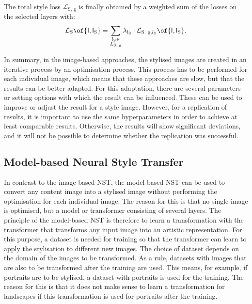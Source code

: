 The total style loss $\mathcal{L}_\text{S, g}$ is finally obtained by a weighted sum of the losses on the selected layers with:
\begin{equation*}
	\mathcal{L}_\text{S}\of{\tensor{I}\eqcommasep \tensor{I}_\text{S}} = \sum_{\substack{l_\text{S} \in\\L_\text{S, g}}} \lambda_{l_\text{S}} \cdot \mathcal{L}_{\text{S, g}\eqcommasep l_\text{S}}\of{\tensor{I}\eqcommasep \tensor{I}_\text{S}} \eqtextdot
\end{equation*}

In summary, in the image-based approaches, the stylised images are created in an iterative process by an optimisation process. This process has to be performed for each individual image, which means that these approaches are slow, but that the results can be better adapted. For this adaptation, there are several parameters or setting options with which the result can be influenced. These can be used to improve or adjust the result for a style image. However, for a replication of results, it is important to use the same hyperparameters in order to achieve at least comparable results. Otherwise, the results will show significant deviations, and it will not be possible to determine whether the replication was successful.

\subsection{Model-based Neural Style Transfer}
In contrast to the image-based \gls{NST}, the model-based \gls{NST} can be used to convert any content image into a stylised image without performing the optimisation for each individual image. The reason for this is that no single image is optimised, but a model or transformer \transformer{} consisting of several layers. The principle of the model-based \gls{NST} is therefore to learn a transformation with the transformer that transforms any input image into an artistic representation. For this purpose, a dataset is needed for training so that the transformer can learn to apply the stylisation to different new images. The choice of dataset depends on the domain of the images to be transformed. As a rule, datasets with images that are also to be transformed after the training are used. This means, for example, if portraits are to be stylised, a dataset with portraits is used for the training. The reason for this is that it does not make sense to learn a transformation for landscapes if this transformation is used for portraits after the training.

